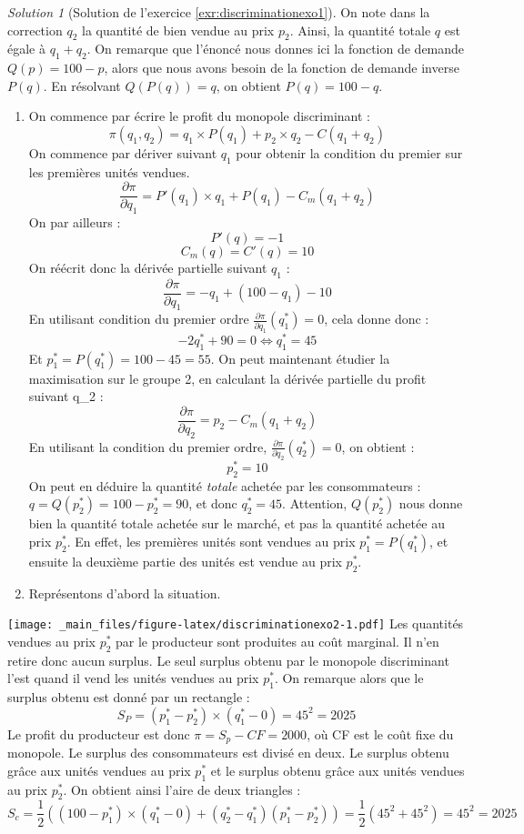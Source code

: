 \documentclass[
]{book}
\providecommand{\tightlist}{%
  \setlength{\itemsep}{0pt}\setlength{\parskip}{0pt}}
\theoremstyle{definition}
\theoremstyle{definition}
\theoremstyle{definition}
\theoremstyle{definition}
\theoremstyle{remark}
\newtheorem*{solution}{Solution}
\begin{document}
\begin{solution}[Solution de l'exercice \ref{exr:discriminationexo1}]

On note dans la correction \(q_2\) la quantité de bien vendue au prix \(p_2\).
Ainsi, la quantité totale \(q\) est égale à \(q_1+q_2\).
On remarque que l'énoncé nous donnes ici la fonction de demande \(Q(p)=100-p\), alors que nous avons besoin de la fonction de demande inverse \(P(q)\).
En résolvant \(Q(P(q))=q\), on obtient \(P(q)=100-q\).

\begin{enumerate}
\def\labelenumi{\arabic{enumi}.}
\tightlist
\item
  On commence par écrire le profit du monopole discriminant :
  \[\pi(q_1, q_2)=q_1\times P(q_1)+p_2\times q_2-C(q_1+q_2)\]
  On commence par dériver suivant \(q_1\) pour obtenir la condition du premier sur les premières unités vendues.
  \[\frac{\partial \pi}{\partial q_1}=P'(q_1)\times q_1+P(q_1)-C_m(q_1+q_2)\]
  On par ailleurs :
  \[P'(q)=-1\]
  \[C_m(q)=C'(q)=10\]
  On réécrit donc la dérivée partielle suivant \(q_1\) :
  \[\frac{\partial \pi}{\partial q_1}=-q_1+(100-q_1)-10\]
  En utilisant condition du premier ordre \(\frac{\partial \pi}{\partial q_1}(q_1^*)=0\), cela donne donc :
  \[-2q_1^*+90=0\Leftrightarrow q_1^*=45\]
  Et \(p_1^*=P(q_1^*)=100-45=55\).
  On peut maintenant étudier la maximisation sur le groupe 2, en calculant la dérivée partielle du profit suivant q\_2 :
  \[\frac{\partial \pi}{\partial q_2}=p_2-C_m(q_1+q_2)\]
  En utilisant la condition du premier ordre, \(\frac{\partial \pi}{\partial q_2}(q_2^*)=0\), on obtient :
  \[p_2^*=10\]
  On peut en déduire la quantité \emph{totale} achetée par les consommateurs :
  \(q=Q(p_2^*)=100-p_2^*=90\), et donc \(q_2^*=45\).
  Attention, \(Q(p_2^*)\) nous donne bien la quantité totale achetée sur le marché, et pas la quantité achetée au prix \(p_2^*\).
  En effet, les premières unités sont vendues au prix \(p_1^*=P(q_1^*)\), et ensuite la deuxième partie des unités est vendue au prix \(p_2^*\).
\item
  Représentons d'abord la situation.
\end{enumerate}

\texttt{[image: \_main\_files/figure-latex/discriminationexo2-1.pdf]}
Les quantités vendues au prix \(p_2^*\) par le producteur sont produites au coût marginal.
Il n'en retire donc aucun surplus.
Le seul surplus obtenu par le monopole discriminant l'est quand il vend les unités vendues au prix \(p_1^*\).
On remarque alors que le surplus obtenu est donné par un rectangle :
\[S_P=(p_1^*-p_2^*)\times(q_1^*-0)=45^2=2025\]
Le profit du producteur est donc \(\pi=S_p-CF=2000\), où CF est le coût fixe du monopole.
Le surplus des consommateurs est divisé en deux.
Le surplus obtenu grâce aux unités vendues au prix \(p_1^*\) et le surplus obtenu grâce aux unités vendues au prix \(p_2^*\).
On obtient ainsi l'aire de deux triangles :
\[S_c=\frac{1}{2}\left((100-p_1^*)\times(q_1^*-0)+(q_2^*-q_1^*)(p_1^*-p_2^*)\right)=\frac{1}{2}(45^2+45^2)=45^2=2025\]


\end{solution}
\end{document}
